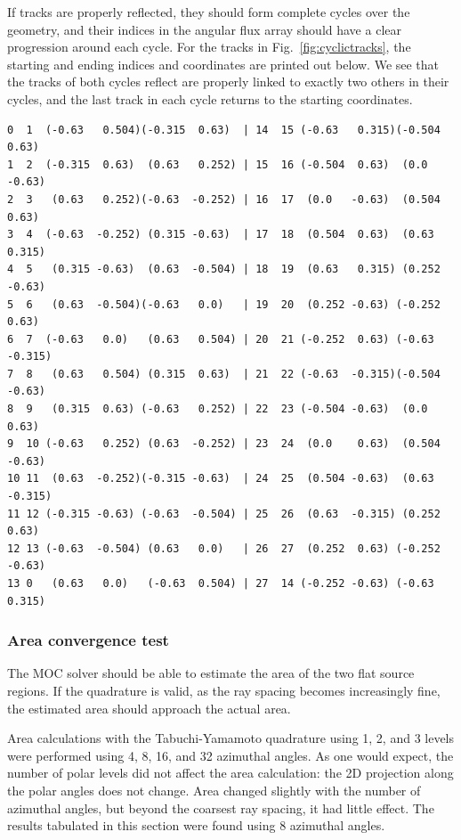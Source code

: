 \documentclass[12pt]{article}
\begin{document}
If tracks are properly reflected, they should form complete cycles over the geometry, and their indices in the angular flux array should have a clear progression around each cycle. For the tracks in Fig.~\ref{fig:cyclictracks}, the starting and ending indices and coordinates are printed out below. We see that the tracks of both cycles reflect are properly linked to exactly two others in their cycles, and the last track in each cycle returns to the starting coordinates.

\begin{verbatim}
0  1  (-0.63   0.504)(-0.315  0.63)  | 14  15 (-0.63   0.315)(-0.504  0.63)
1  2  (-0.315  0.63)  (0.63   0.252) | 15  16 (-0.504  0.63)  (0.0  -0.63)
2  3   (0.63   0.252)(-0.63  -0.252) | 16  17  (0.0   -0.63)  (0.504  0.63)
3  4  (-0.63  -0.252) (0.315 -0.63)  | 17  18  (0.504  0.63)  (0.63  0.315)
4  5   (0.315 -0.63)  (0.63  -0.504) | 18  19  (0.63   0.315) (0.252  -0.63)
5  6   (0.63  -0.504)(-0.63   0.0)   | 19  20  (0.252 -0.63) (-0.252  0.63)
6  7  (-0.63   0.0)   (0.63   0.504) | 20  21 (-0.252  0.63) (-0.63  -0.315)
7  8   (0.63   0.504) (0.315  0.63)  | 21  22 (-0.63  -0.315)(-0.504  -0.63)
8  9   (0.315  0.63) (-0.63   0.252) | 22  23 (-0.504 -0.63)  (0.0  0.63)
9  10 (-0.63   0.252) (0.63  -0.252) | 23  24  (0.0    0.63)  (0.504  -0.63)
10 11  (0.63  -0.252)(-0.315 -0.63)  | 24  25  (0.504 -0.63)  (0.63  -0.315)
11 12 (-0.315 -0.63) (-0.63  -0.504) | 25  26  (0.63  -0.315) (0.252  0.63)
12 13 (-0.63  -0.504) (0.63   0.0)   | 26  27  (0.252  0.63) (-0.252  -0.63)
13 0   (0.63   0.0)   (-0.63  0.504) | 27  14 (-0.252 -0.63) (-0.63  0.315)
\end{verbatim}


\newpage
\subsubsection{Area convergence test}\label{sec:testarea}

The MOC solver should be able to estimate the area of the two flat source regions. If the quadrature is valid, as the ray spacing becomes increasingly fine, the estimated area should approach the actual area.

Area calculations with the Tabuchi-Yamamoto quadrature using 1, 2, and 3 levels were performed using 4, 8, 16, and 32 azimuthal angles. As one would expect, the number of polar levels did not affect the area calculation: the 2D projection along the polar angles does not change. Area changed slightly with the number of azimuthal angles, but beyond the coarsest ray spacing, it had little effect. The results tabulated in this section were found using 8 azimuthal angles.
\end{document}
